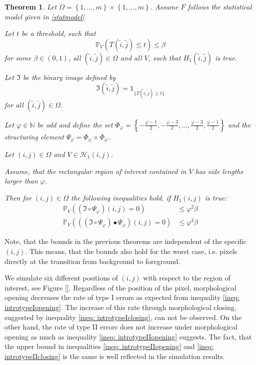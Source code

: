 \documentclass[a4paper,12pt]{article}
\theoremstyle{plain}
\newtheorem{theorem}{Theorem}[section]
\theoremstyle{definition}
\begin{document}
\begin{theorem}
	Let $\Omega = \left\{ 1, \dots, m \right\} \times \left\{ 1, \dots, m \right\}$. Assume $F$ follows the statistical model given in \eqref{statmodel}.
	
	Let $t$ be a threshold, such that
	\begin{equation*}
		\mathbb{P}_V\left( T(\tilde{i}, \tilde{j}) \leq t \right) \leq \beta
	\end{equation*}
	for some $\beta \in (0, 1)$, all $(\tilde{i}, \tilde{j}) \in \Omega$ and all $V$, such that $H_1(\tilde{i}, \tilde{j})$ is true.
	
	Let $\mathfrak{I}$ be the binary image defined by
	\begin{equation*}
		\mathfrak{I}(\tilde{i}, \tilde{j}) = \mathds{1}_{ \{ T(\tilde{i}, \tilde{j}) \geq t \} }
	\end{equation*}
	for all $(\tilde{i}, \tilde{j}) \in \Omega$.
	
	Let $\varphi \in \mathbb{N}$ be odd and define the set $\Phi_\varphi = \left\{ -\frac{\varphi - 1}{2}, -\frac{\varphi - 3}{2}, \dots, \frac{\varphi - 3}{2}, \frac{\varphi - 1}{2} \right\}$ and the structuring element $\Psi_\varphi = \Phi_\varphi \times \Phi_\varphi$.
	
	Let $(i, j) \in \Omega$ and $V \in \mathcal{H}_1(i, j)$.
	
	Assume, that the rectangular region of interest contained in $V$ has side lengths larger than $\varphi$.
	
	Then for $(i, j) \in \Omega$ the following inequalities hold, if $H_1(i, j)$ is true:
	\begin{align}
		\mathbb{P}_V\left( (\mathfrak{I} \circ \Psi_\varphi)(i, j) = 0 \right) &\leq \varphi^2 \beta \label{ineq: introtypeIIopening} \\
		\mathbb{P}_V\left( ((\mathfrak{I} \circ \Psi_\varphi) \bullet \Psi_\varphi)(i, j) = 0 \right) &\leq \varphi^2 \beta \label{ineq: introtypeIIclosing}
	\end{align}
\end{theorem}

Note, that the bounds in the previous theorems are independent of the specific $(i, j)$. This means, that the bounds also hold for the worst case, i.e. pixels directly at the transition from background to foreground.

We simulate six different positions of $(i, j)$ with respect to the region of interest, see Figure \ref{}. Regardless of the position of the pixel, morphological opening decreases the rate of type I errors as expected from inequality \eqref{ineq: introtypeIopening}. The increase of this rate through morphological closing, suggested by inequality \eqref{ineq: introtypeIclosing}, can not be observed. On the other hand, the rate of type II errors does not increase under morphological opening as much as inequality \eqref{ineq: introtypeIIopening} suggests. The fact, that the upper bound in inequalities \eqref{ineq: introtypeIIopening} and \eqref{ineq: introtypeIIclosing} is the same is well reflected in the simulation results.
\end{document}
